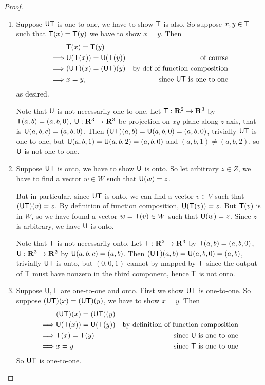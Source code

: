 \begin{proof} \ 
\begin{enumerate}
\item Suppose \(\textsf{U}\textsf{T}\) is one-to-one, we have to show \(\textsf{T}\) is also.
So suppose \(x, y \in \textsf{T}\) such that \(\textsf{T}(x) = \textsf{T}(y)\) we have to show \(x = y\).
Then
\begin{align*}
             & \textsf{T}(x) = \textsf{T}(y) \\
    \implies & \textsf{U}(\textsf{T}(x)) = \textsf{U}(\textsf{T}(y)) & \text{of course} \\
    \implies & (\textsf{U}\textsf{T})(x) = (\textsf{U}\textsf{T})(y) & \text{by def of function composition} \\
    \implies & x = y, & \text{since \(\textsf{U}\textsf{T}\) is one-to-one}
\end{align*}
as desired.

Note that \(\textsf{U}\) is not necessarily one-to-one.
Let \(\textsf{T} : \mathbf{R}^2 \to \mathbf{R}^3\) by \(\textsf{T}(a, b) = (a, b, 0)\), \(\textsf{U} : \mathbf{R}^3 \to \mathbf{R}^3\) be projection on \(xy\)-plane along \(z\)-axis, that is \(\textsf{U}(a, b, c) = (a, b, 0)\).
Then \((\textsf{U}\textsf{T})(a, b) = \textsf{U}(a, b, 0) = (a, b, 0)\), trivially \(\textsf{U}\textsf{T}\) is one-to-one, but \(\textsf{U}(a, b, 1) = \textsf{U}(a, b, 2) = (a, b, 0)\) and \((a, b, 1) \ne (a, b, 2)\), so \(\textsf{U}\) is not one-to-one.

\item
Suppose \(\textsf{U}\textsf{T}\) is onto, we have to show \(\textsf{U}\) is onto.
So let arbitrary \(z \in Z\), we have to find a vector \(w \in W\) such that \(\textsf{U}(w) = z\).

But in particular, since \(\textsf{U}\textsf{T}\) is onto, we can find a vector \(v \in V\) such that \((\textsf{U}\textsf{T})(v) = z\).
By definition of function composition, \(\textsf{U}(\textsf{T}(v)) = z\).
But \(\textsf{T}(v)\) is in \(W\), so we have found a vector \(w = \textsf{T}(v) \in W\) such that \(\textsf{U}(w) = z\).
Since \(z\) is arbitrary, we have \(\textsf{U}\) is onto.

Note that \(\textsf{T}\) is not necessarily onto.
Let \(\textsf{T} : \mathbf{R}^2 \to \mathbf{R}^3\) by \(\textsf{T}(a, b) = (a, b, 0)\), \(\textsf{U} : \mathbf{R}^3 \to \mathbf{R}^2\) by \(\textsf{U}(a, b, c) = (a, b)\).
Then \((\textsf{U}\textsf{T})(a, b) = \textsf{U}(a, b, 0) = (a, b)\), trivially \(\textsf{U}\textsf{T}\) is onto, but \((0, 0, 1)\) cannot by mapped by \(\textsf{T}\) since the output of \(\textsf{T}\) must have nonzero in the third component, hence \(\textsf{T}\) is not onto.

\item Suppose \(\textsf{U}, \textsf{T}\) are one-to-one and onto.
First we show \(\textsf{U}\textsf{T}\) is one-to-one.
So suppose \((\textsf{U}\textsf{T})(x) = (\textsf{U}\textsf{T})(y)\), we have to show \(x = y\).
Then
\begin{align*}
             & (\textsf{U}\textsf{T})(x) = (\textsf{U}\textsf{T})(y) \\
    \implies & \textsf{U}(\textsf{T}(x)) = \textsf{U}(\textsf{T}(y)) & \text{by definition of function composition} \\
    \implies & \textsf{T}(x) = \textsf{T}(y) & \text{since \(\textsf{U}\) is one-to-one} \\
    \implies & x = y & \text{since \(\textsf{T}\) is one-to-one}
\end{align*}
So \(\textsf{U}\textsf{T}\) is one-to-one.


\end{enumerate}
\end{proof}
